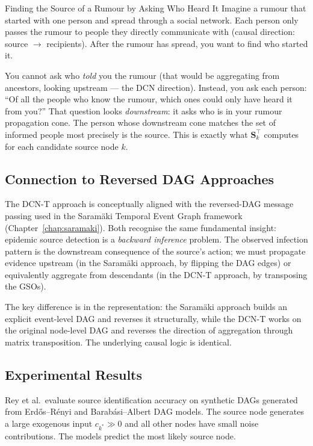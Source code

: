 \begin{analogybox}{Finding the Source of a Rumour by Asking Who Heard It}
Imagine a rumour that started with one person and spread through a social
network. Each person only passes the rumour to people they directly communicate
with (causal direction: source $\to$ recipients). After the rumour has spread,
you want to find who started it.

You cannot ask who \emph{told} you the rumour (that would be aggregating from
ancestors, looking upstream --- the DCN direction). Instead, you ask each person:
``Of all the people who know the rumour, which ones could only have heard it from
you?'' That question looks \emph{downstream}: it asks who is in your rumour
propagation cone. The person whose downstream cone matches the set of informed
people most precisely is the source. This is exactly what $\mathbf{S}_k^\top$
computes for each candidate source node $k$.
\end{analogybox}

\subsection{Connection to Reversed DAG Approaches}

The DCN-T approach is conceptually aligned with the reversed-DAG message
passing used in the Saram\"{a}ki Temporal Event Graph framework (Chapter~\ref{chap:saramaki}).
Both recognise the same fundamental insight: epidemic source detection is a
\emph{backward inference} problem. The observed infection pattern is the
downstream consequence of the source's action; we must propagate evidence
upstream (in the Saram\"{a}ki approach, by flipping the DAG edges) or equivalently
aggregate from descendants (in the DCN-T approach, by transposing the GSOs).

The key difference is in the representation: the Saram\"{a}ki approach builds
an explicit event-level DAG and reverses it structurally, while the DCN-T works
on the original node-level DAG and reverses the direction of aggregation through
matrix transposition. The underlying causal logic is identical.

\subsection{Experimental Results}

Rey et al.\ evaluate source identification accuracy on synthetic DAGs generated
from Erd\H{o}s--R\'{e}nyi and Barab\'{a}si--Albert DAG models. The source node
generates a large exogenous input $c_{k^*} \gg 0$ and all other nodes have
small noise contributions. The models predict the most likely source node.

